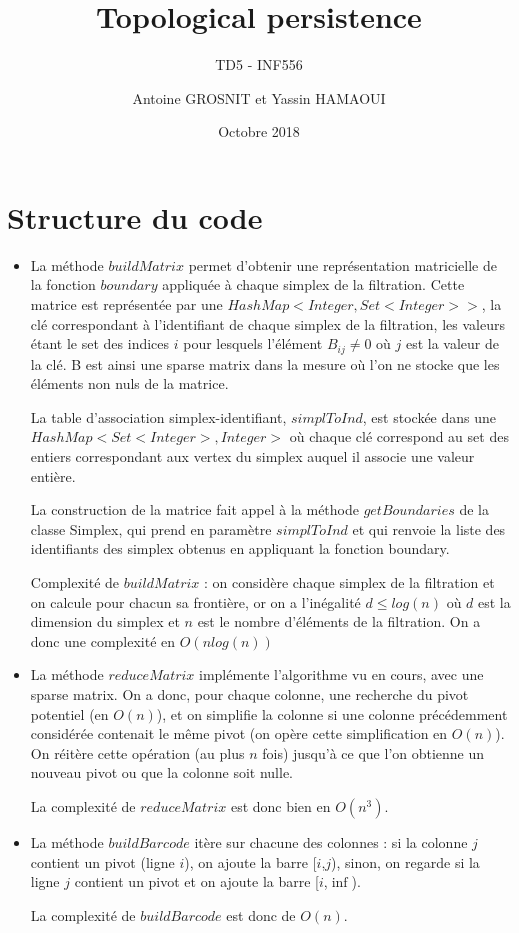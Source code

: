 \documentclass[a4paper,11pt]{article}
\title{Topological persistence}
\author{Antoine GROSNIT et Yassin HAMAOUI}
\subtitle{TD5 - INF556}
\date{Octobre 2018}
\begin{document}
\maketitle
\section{Structure du code}

\begin{itemize}
\item La méthode $buildMatrix$ permet d'obtenir une représentation matricielle de la fonction $boundary$ appliquée à chaque simplex de la filtration. Cette matrice est représentée par une $HashMap<Integer, Set<Integer>>$, la clé correspondant à l'identifiant de chaque simplex de la filtration, les valeurs étant le set des indices $i$ pour lesquels l'élément $B_{ij} \neq 0$ où $j$ est la valeur de la clé. B est ainsi une sparse matrix dans la mesure où l'on ne stocke que les éléments non nuls de la matrice.

La table d'association simplex-identifiant, $simplToInd$,  est stockée dans une $HashMap<Set<Integer>, Integer>$ où chaque clé correspond au set des entiers correspondant aux vertex du simplex auquel il associe une valeur entière.

La construction de la matrice fait appel à la méthode $getBoundaries$ de la classe Simplex, qui prend en paramètre  $simplToInd$ et qui renvoie la liste des identifiants des simplex obtenus en appliquant la fonction boundary.

Complexité de $buildMatrix$ : on considère chaque simplex de la filtration et on calcule pour chacun sa frontière, or on a l'inégalité $d \leq log (n)$ où $d$ est la dimension du simplex et $n$ est le nombre d'éléments de la filtration. On a donc une complexité en $O(nlog(n))$\\

\item La méthode $reduceMatrix$ implémente l'algorithme vu en cours, avec une sparse matrix. On a donc, pour chaque colonne, une recherche du pivot potentiel (en $O(n)$), et on simplifie la colonne si une colonne précédemment considérée contenait le même pivot (on opère cette simplification en $O(n)$). On réitère cette opération (au plus $n$ fois) jusqu'à ce que l'on obtienne un nouveau pivot ou que la colonne soit nulle.

La complexité de $reduceMatrix$ est donc bien en $O(n^3)$.\\

\item La méthode $buildBarcode$ itère sur chacune des colonnes : si la colonne $j$ contient un pivot (ligne $i$), on ajoute la barre [$i$,$j$), sinon, on regarde si la ligne $j$ contient un pivot et on ajoute la barre [$i$,$\inf$).

La complexité de $buildBarcode$ est donc de $O(n)$.

\end{itemize}
\end{document}
